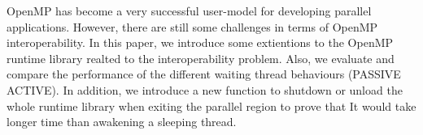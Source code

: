 OpenMP has become a very successful user-model for developing parallel applications. 
However, there are still some challenges in terms of OpenMP interoperability. 
In this paper, we introduce some extientions to the OpenMP runtime library realted to the interoperability problem. 
Also, we evaluate and compare the performance of the different waiting thread behaviours (PASSIVE \textbar ACTIVE). 
In addition, we introduce a new function to shutdown or unload the whole runtime library when exiting the parallel 
region to prove that It would take longer time than awakening a sleeping thread.